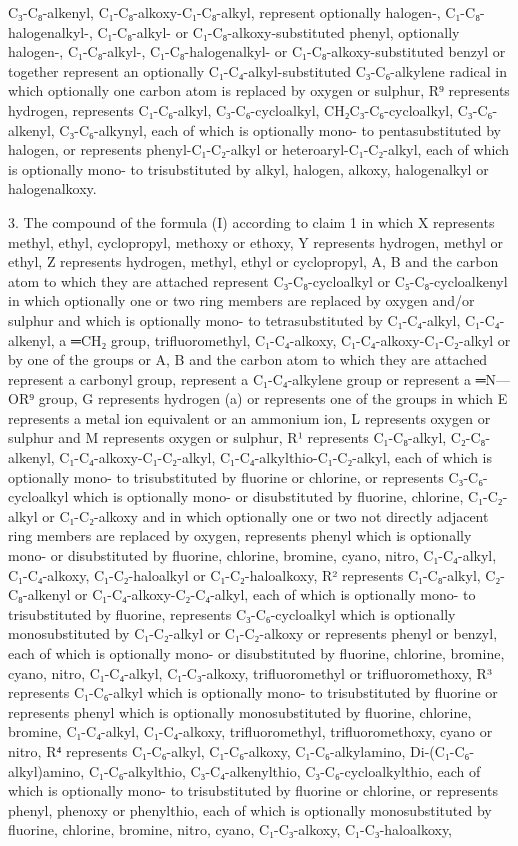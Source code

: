 \documentclass[11pt,a4paper]{article}
\begin{document}
C₃-C₈-alkenyl, C₁-C₈-alkoxy-C₁-C₈-alkyl, represent optionally halogen-, C₁-C₈-halogenalkyl-, C₁-C₈-alkyl- or C₁-C₈-alkoxy-substituted phenyl, optionally halogen-, C₁-C₈-alkyl-, C₁-C₈-halogenalkyl- or C₁-C₈-alkoxy-substituted benzyl or together represent an optionally C₁-C₄-alkyl-substituted C₃-C₆-alkylene radical in which optionally one carbon atom is replaced by oxygen or sulphur, R⁹ represents hydrogen, represents C₁-C₆-alkyl, C₃-C₆-cycloalkyl, CH₂C₃-C₆-cycloalkyl, C₃-C₆-alkenyl, C₃-C₆-alkynyl, each of which is optionally mono- to pentasubstituted by halogen, or represents phenyl-C₁-C₂-alkyl or heteroaryl-C₁-C₂-alkyl, each of which is optionally mono- to trisubstituted by alkyl, halogen, alkoxy, halogenalkyl or halogenalkoxy.

3. The compound of the formula (I) according to claim 1 in which X represents methyl, ethyl, cyclopropyl, methoxy or ethoxy, Y represents hydrogen, methyl or ethyl, Z represents hydrogen, methyl, ethyl or cyclopropyl, A, B and the carbon atom to which they are attached represent C₃-C₈-cycloalkyl or C₅-C₈-cycloalkenyl in which optionally one or two ring members are replaced by oxygen and/or sulphur and which is optionally mono- to tetrasubstituted by C₁-C₄-alkyl, C₁-C₄-alkenyl, a ═CH₂ group, trifluoromethyl, C₁-C₄-alkoxy, C₁-C₄-alkoxy-C₁-C₂-alkyl or by one of the groups or A, B and the carbon atom to which they are attached represent a carbonyl group, represent a C₁-C₄-alkylene group or represent a ═N—OR⁹ group, G represents hydrogen (a) or represents one of the groups in which E represents a metal ion equivalent or an ammonium ion, L represents oxygen or sulphur and M represents oxygen or sulphur, R¹ represents C₁-C₈-alkyl, C₂-C₈-alkenyl, C₁-C₄-alkoxy-C₁-C₂-alkyl, C₁-C₄-alkylthio-C₁-C₂-alkyl, each of which is optionally mono- to trisubstituted by fluorine or chlorine, or represents C₃-C₆-cycloalkyl which is optionally mono- or disubstituted by fluorine, chlorine, C₁-C₂-alkyl or C₁-C₂-alkoxy and in which optionally one or two not directly adjacent ring members are replaced by oxygen, represents phenyl which is optionally mono- or disubstituted by fluorine, chlorine, bromine, cyano, nitro, C₁-C₄-alkyl, C₁-C₄-alkoxy, C₁-C₂-haloalkyl or C₁-C₂-haloalkoxy, R² represents C₁-C₈-alkyl, C₂-C₈-alkenyl or C₁-C₄-alkoxy-C₂-C₄-alkyl, each of which is optionally mono- to trisubstituted by fluorine, represents C₃-C₆-cycloalkyl which is optionally monosubstituted by C₁-C₂-alkyl or C₁-C₂-alkoxy or represents phenyl or benzyl, each of which is optionally mono- or disubstituted by fluorine, chlorine, bromine, cyano, nitro, C₁-C₄-alkyl, C₁-C₃-alkoxy, trifluoromethyl or trifluoromethoxy, R³ represents C₁-C₆-alkyl which is optionally mono- to trisubstituted by fluorine or represents phenyl which is optionally monosubstituted by fluorine, chlorine, bromine, C₁-C₄-alkyl, C₁-C₄-alkoxy, trifluoromethyl, trifluoromethoxy, cyano or nitro, R⁴ represents C₁-C₆-alkyl, C₁-C₆-alkoxy, C₁-C₆-alkylamino, Di-(C₁-C₆-alkyl)amino, C₁-C₆-alkylthio, C₃-C₄-alkenylthio, C₃-C₆-cycloalkylthio, each of which is optionally mono- to trisubstituted by fluorine or chlorine, or represents phenyl, phenoxy or phenylthio, each of which is optionally monosubstituted by fluorine, chlorine, bromine, nitro, cyano, C₁-C₃-alkoxy, C₁-C₃-haloalkoxy, 
\end{document}
